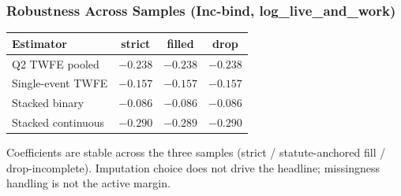 \documentclass[xcolor = x11names, compress, aspectratio = 169]{beamer}
\begin{document}
    \begin{frame}
    \frametitle{Robustness Across Samples (Inc-bind, log\_live\_and\_work)}
        \centering
        \footnotesize
        \renewcommand{\arraystretch}{1.20}
        \setlength{\tabcolsep}{8pt}
        \begin{tabular}{lccc}
            \toprule
            Estimator & strict & filled & drop \\
            \midrule
            Q2 TWFE pooled       & $-0.238$ & $-0.238$ & $-0.238$ \\
            Single-event TWFE    & $-0.157$ & $-0.157$ & $-0.157$ \\
            Stacked binary       & $-0.086$ & $-0.086$ & $-0.086$ \\
            Stacked continuous   & $-0.290$ & $-0.289$ & $-0.290$ \\
            \bottomrule
        \end{tabular}
        \medskip

        \footnotesize
        Coefficients are stable across the three samples
        (strict / statute-anchored fill / drop-incomplete). Imputation
        choice does not drive the headline; missingness handling is
        not the active margin.
    \end{frame}
\end{document}
